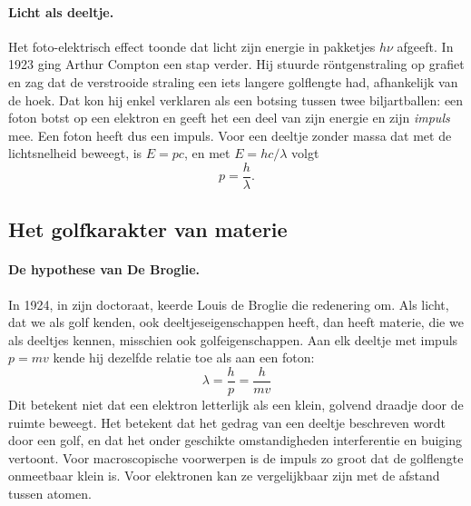\paragraph{Licht als deeltje.} Het foto-elektrisch effect toonde dat licht zijn energie in pakketjes $h\nu$ afgeeft. In 1923 ging Arthur Compton een stap verder. Hij stuurde röntgenstraling op grafiet en zag dat de verstrooide straling een iets langere golflengte had, afhankelijk van de hoek. Dat kon hij enkel verklaren als een botsing tussen twee biljartballen: een foton botst op een elektron en geeft het een deel van zijn energie en zijn \emph{impuls} mee. Een foton heeft dus een impuls. Voor een deeltje zonder massa dat met de lichtsnelheid beweegt, is $E = pc$, en met $E = hc/\lambda$ volgt
\[
p = \frac{h}{\lambda}.
\]

\subsection{Het golfkarakter van materie}

\paragraph{De hypothese van De Broglie.}
In 1924, in zijn doctoraat, keerde Louis de Broglie die redenering om. Als licht, dat we als golf kenden, ook deeltjeseigenschappen heeft, dan heeft materie, die we als deeltjes kennen, misschien ook golfeigenschappen. Aan elk deeltje met impuls $p=mv$ kende hij dezelfde relatie toe als aan een foton:
\begin{equation}
\boxed{
\lambda=\frac{h}{p}=\frac{h}{mv}
}
\end{equation}
Dit betekent niet dat een elektron letterlijk als een klein, golvend draadje door de ruimte beweegt. Het betekent dat het gedrag van een deeltje beschreven wordt door een golf, en dat het onder geschikte omstandigheden interferentie en buiging vertoont. Voor macroscopische voorwerpen is de impuls zo groot dat de golflengte onmeetbaar klein is. Voor elektronen kan ze vergelijkbaar zijn met de afstand tussen atomen.

